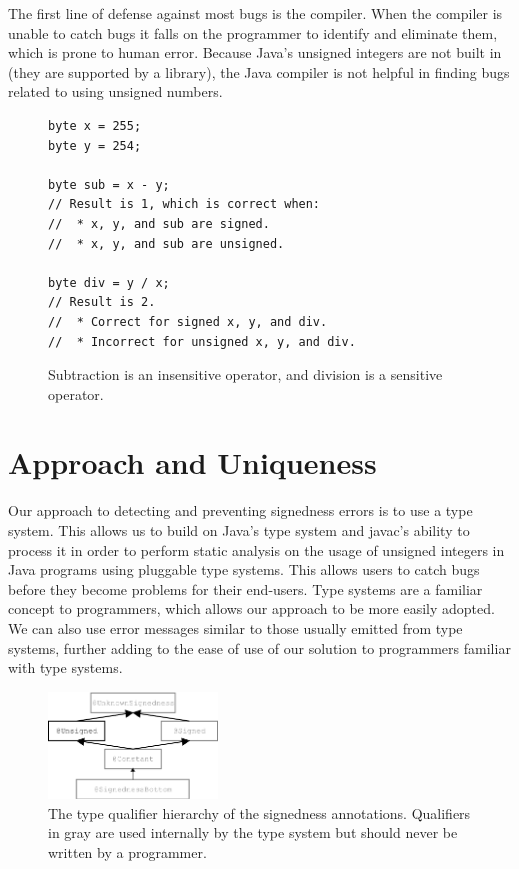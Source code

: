 \documentclass{sig-alternate-05-2015}
\begin{document}
The first line of defense against most bugs is the compiler. When the
compiler is unable to catch bugs it falls on the programmer to identify and
eliminate them, which is prone to human error. Because Java's unsigned
integers are not built in (they are supported by a library), the Java
compiler is not helpful in finding bugs related to using unsigned
numbers.

\begin{figure}
\smaller
\begin{lstlisting}
byte x = 255;
byte y = 254;

byte sub = x - y;
// Result is 1, which is correct when:
//  * x, y, and sub are signed.
//  * x, y, and sub are unsigned.

byte div = y / x;
// Result is 2.
//  * Correct for signed x, y, and div.
//  * Incorrect for unsigned x, y, and div.
\end{lstlisting}
\caption{Subtraction is an insensitive operator, and
  division is a sensitive operator.}
\label{fig:operators}
\end{figure}


\section{Approach and Uniqueness}

Our approach to detecting and preventing signedness errors is to use a type system. This allows us to build on Java's type system and javac's ability to process it in order to perform static analysis on the usage of unsigned integers in Java programs using pluggable type systems. This allows users to catch bugs before they become problems for their end-users. Type systems are a familiar concept to programmers, which allows our approach to be more easily adopted. We can also use error messages similar to those usually emitted from type systems, further adding to the ease of use of our solution to programmers familiar with type systems.

\begin{figure}
    \centering
    \includegraphics[width=0.4\textwidth]{signedness}
    \caption{The type qualifier hierarchy of the signedness annotations.
Qualifiers in gray are used internally by the type system but should never be written by a programmer.}
    \label{fig:my_label}
\end{figure}
\end{document}
